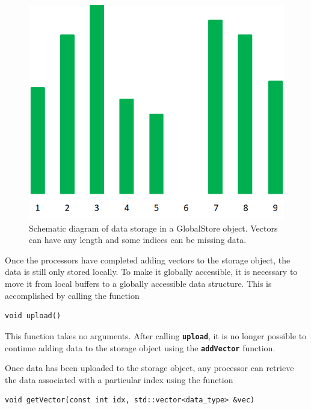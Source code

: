 \documentclass[12pt]{report} %
\begin{document}
\begin{figure}
  \centering
    \includegraphics*[width=6.5in, height=3.72in, keepaspectratio=true]{Fig12}
  \caption{Schematic diagram of data storage in a GlobalStore object. Vectors can have any length and some indices can be missing data.}
  \label{fig:fig-12}
\end{figure}



Once the processors have completed adding vectors to the storage object, the data is still only stored locally. To make it globally accessible, it is necessary to move it from local buffers to a globally accessible data structure. This is accomplished by calling the function

{
\color{red}
\begin{Verbatim}[fontseries=b]
void upload()
\end{Verbatim}
}

This function takes no arguments. After calling \texttt{\textbf{upload}}, it is no longer possible to continue adding data to the storage object using the \texttt{\textbf{addVector}} function.

Once data has been uploaded to the storage object, any processor can retrieve the data associated with a particular index using the function

{
\color{red}
\begin{Verbatim}[fontseries=b]
void getVector(const int idx, std::vector<data_type> &vec)
\end{Verbatim}
}
\end{document}
